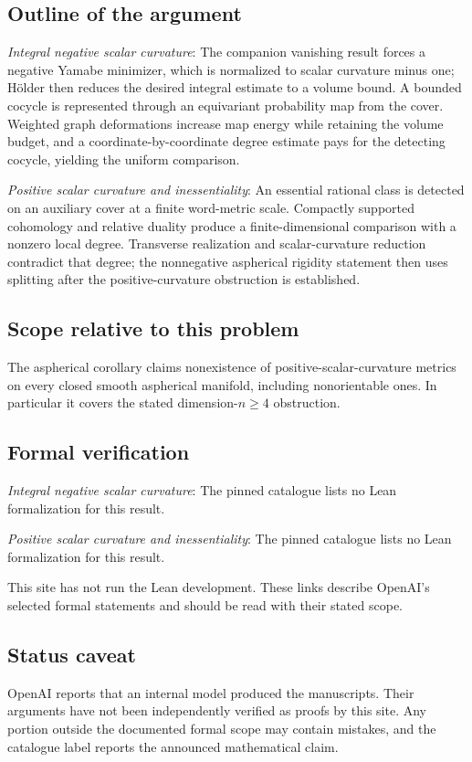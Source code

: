 \documentclass[11pt]{article}
\begin{document}
\subsection{Outline of the argument}
\textit{Integral negative scalar curvature}: The companion vanishing result forces a negative Yamabe minimizer, which is normalized to scalar curvature minus one; Hölder then reduces the desired integral estimate to a volume bound. A bounded cocycle is represented through an equivariant probability map from the cover. Weighted graph deformations increase map energy while retaining the volume budget, and a coordinate-by-coordinate degree estimate pays for the detecting cocycle, yielding the uniform comparison.

\textit{Positive scalar curvature and inessentiality}: An essential rational class is detected on an auxiliary cover at a finite word-metric scale. Compactly supported cohomology and relative duality produce a finite-dimensional comparison with a nonzero local degree. Transverse realization and scalar-curvature reduction contradict that degree; the nonnegative aspherical rigidity statement then uses splitting after the positive-curvature obstruction is established.

\subsection{Scope relative to this problem}
The aspherical corollary claims nonexistence of positive-scalar-curvature metrics on every closed smooth aspherical manifold, including nonorientable ones. In particular it covers the stated dimension-$n\ge4$ obstruction.

\subsection{Formal verification}
\textit{Integral negative scalar curvature}: The pinned catalogue lists no Lean formalization for this result.

\textit{Positive scalar curvature and inessentiality}: The pinned catalogue lists no Lean formalization for this result.

This site has not run the Lean development. These links describe OpenAI’s selected formal statements and should be read with their stated scope.

\subsection{Status caveat}
OpenAI reports that an internal model produced the manuscripts. Their arguments have not been independently verified as proofs by this site. Any portion outside the documented formal scope may contain mistakes, and the catalogue label reports the announced mathematical claim.
\end{document}
